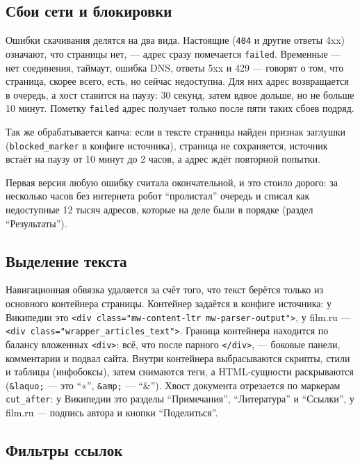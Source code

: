 \subsection*{Сбои сети и блокировки}

Ошибки скачивания делятся на два вида. Настоящие (\texttt{404} и другие ответы
4xx) означают, что страницы нет, --- адрес сразу помечается \texttt{failed}.
Временные --- нет соединения, таймаут, ошибка DNS, ответы 5xx и 429 --- говорят
о том, что страница, скорее всего, есть, но сейчас недоступна. Для них адрес
возвращается в очередь, а хост ставится на паузу: 30 секунд, затем вдвое
дольше, но не больше 10 минут. Пометку \texttt{failed} адрес получает только
после пяти таких сбоев подряд.

Так же обрабатывается капча: если в тексте страницы найден признак заглушки
(\texttt{blocked\_marker} в конфиге источника), страница не сохраняется,
источник встаёт на паузу от 10 минут до 2 часов, а адрес ждёт повторной попытки.

Первая версия любую ошибку считала окончательной, и это стоило дорого: за
несколько часов без интернета робот \enquote{пролистал} очередь и списал как
недоступные 12 тысяч адресов, которые на деле были в порядке (раздел
\enquote{Результаты}).

\subsection*{Выделение текста}

Навигационная обвязка удаляется за счёт того, что текст берётся только из
основного контейнера страницы. Контейнер задаётся в конфиге источника: у
Википедии это \texttt{<div class="mw-content-ltr mw-parser-output">}, у film.ru ---
\texttt{<div class="wrapper\_articles\_text">}. Граница контейнера находится по
балансу вложенных \texttt{<div>}: всё, что после парного \texttt{</div>}, ---
боковые панели, комментарии и подвал сайта. Внутри контейнера выбрасываются
скрипты, стили и таблицы (инфобоксы), затем снимаются теги, а HTML-сущности
раскрываются (\texttt{\&laquo;} --- это \enquote{«}, \texttt{\&amp;} --- \enquote{\&}). Хвост
документа отрезается по маркерам \texttt{cut\_after}: у Википедии это разделы
\enquote{Примечания}, \enquote{Литература} и \enquote{Ссылки}, у film.ru ---
подпись автора и кнопки \enquote{Поделиться}.

\subsection*{Фильтры ссылок}

